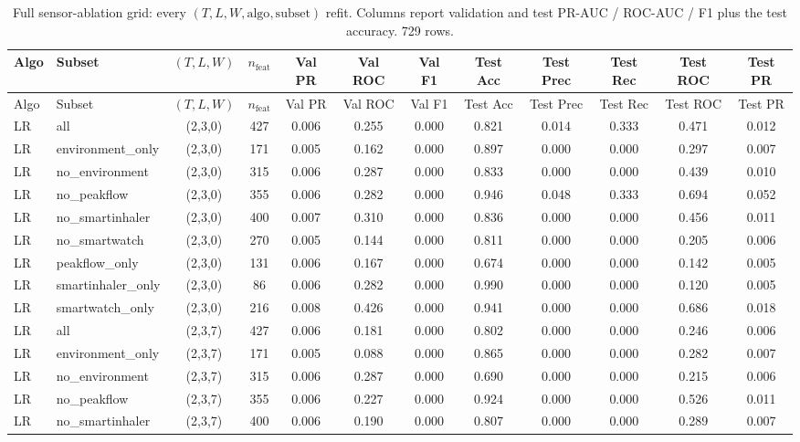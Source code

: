 \begin{longtable}{llcccccccccc}
\caption{Full sensor-ablation grid: every $(T,L,W,\text{algo},\text{subset})$ refit.  Columns report validation and test PR-AUC / ROC-AUC / F1 plus the test accuracy.  729 rows.}\label{tab:v2_sensor_full}\\
\toprule
Algo & Subset & $(T,L,W)$ & $n_{\text{feat}}$ & Val PR & Val ROC & Val F1 & Test Acc & Test Prec & Test Rec & Test ROC & Test PR \\
\midrule
\endfirsthead
\toprule
Algo & Subset & $(T,L,W)$ & $n_{\text{feat}}$ & Val PR & Val ROC & Val F1 & Test Acc & Test Prec & Test Rec & Test ROC & Test PR \\
\midrule
\endhead
\bottomrule
\endfoot
LR & all & (2,3,0) & 427 & 0.006 & 0.255 & 0.000 & 0.821 & 0.014 & 0.333 & 0.471 & 0.012 \\
LR & environment\_only & (2,3,0) & 171 & 0.005 & 0.162 & 0.000 & 0.897 & 0.000 & 0.000 & 0.297 & 0.007 \\
LR & no\_environment & (2,3,0) & 315 & 0.006 & 0.287 & 0.000 & 0.833 & 0.000 & 0.000 & 0.439 & 0.010 \\
LR & no\_peakflow & (2,3,0) & 355 & 0.006 & 0.282 & 0.000 & 0.946 & 0.048 & 0.333 & 0.694 & 0.052 \\
LR & no\_smartinhaler & (2,3,0) & 400 & 0.007 & 0.310 & 0.000 & 0.836 & 0.000 & 0.000 & 0.456 & 0.011 \\
LR & no\_smartwatch & (2,3,0) & 270 & 0.005 & 0.144 & 0.000 & 0.811 & 0.000 & 0.000 & 0.205 & 0.006 \\
LR & peakflow\_only & (2,3,0) & 131 & 0.006 & 0.167 & 0.000 & 0.674 & 0.000 & 0.000 & 0.142 & 0.005 \\
LR & smartinhaler\_only & (2,3,0) & 86 & 0.006 & 0.282 & 0.000 & 0.990 & 0.000 & 0.000 & 0.120 & 0.005 \\
LR & smartwatch\_only & (2,3,0) & 216 & 0.008 & 0.426 & 0.000 & 0.941 & 0.000 & 0.000 & 0.686 & 0.018 \\
LR & all & (2,3,7) & 427 & 0.006 & 0.181 & 0.000 & 0.802 & 0.000 & 0.000 & 0.246 & 0.006 \\
LR & environment\_only & (2,3,7) & 171 & 0.005 & 0.088 & 0.000 & 0.865 & 0.000 & 0.000 & 0.282 & 0.007 \\
LR & no\_environment & (2,3,7) & 315 & 0.006 & 0.287 & 0.000 & 0.690 & 0.000 & 0.000 & 0.215 & 0.006 \\
LR & no\_peakflow & (2,3,7) & 355 & 0.006 & 0.227 & 0.000 & 0.924 & 0.000 & 0.000 & 0.526 & 0.011 \\
LR & no\_smartinhaler & (2,3,7) & 400 & 0.006 & 0.190 & 0.000 & 0.807 & 0.000 & 0.000 & 0.289 & 0.007 \\

\end{longtable}
